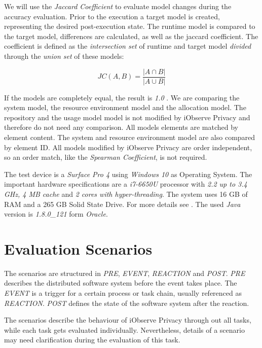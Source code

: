 We will use the \textit{Jaccard Coefficient} to evaluate model changes during the accuracy evaluation. Prior to the execution a target model is created, representing the desired post-execution state. The runtime model is compared to the target model, differences are calculated, as well as the jaccard coefficient. The coefficient is defined as the \textit{intersection set} of runtime and target model \textit{divided} through the \textit{union set} of these models:

$$JC(A,B)=\frac{\left | A \cap B \right |}{\left | A \cup B \right |}$$

If the models are completely equal, the result is \textit{1.0} \cite{Andale.20161202}. We are comparing the system model, the resource environment model and the allocation model. The repository and the usage model model is not modified by iObserve Privacy and therefore do not need any comparison. All models elements are matched by element content. The system and resource environment model are also compared by element ID. All models modified by iObserve Privacy are order independent, so an order match, like the \textit{Spearman Coefficient}, is not required.

The test device is a \textit{Surface Pro 4} using \textit{Windows 10} as Operating System. The important hardware specifications are a \textit{i7-6650U} processor with \textit{2.2 up to 3.4 GHz, 4 MB cache} and \textit{2 cores with hyper-threading}. The system uses 16 GB of RAM and a 265 GB Solid State Drive. For more details see \cite{Wikipedia.20170613}. The used \textit{Java} version is \textit{1.8.0\_121} form \textit{Oracle}.


\section{Evaluation Scenarios}
\label{sec:Evaluation:scenarios}

The scenarios are structured in \textit{PRE}, \textit{EVENT}, \textit{REACTION} and \textit{POST}. \textit{PRE} describes the distributed software system before the event takes place. The \textit{EVENT} is a trigger for a certain process or task chain, usually referenced as \textit{REACTION}. \textit{POST} defines the state of the software system after the reaction.

The scenarios describe the behaviour of iObserve Privacy through out all tasks, while each task gets evaluated individually. Nevertheless, details of a scenario may need clarification during the evaluation of this task.

